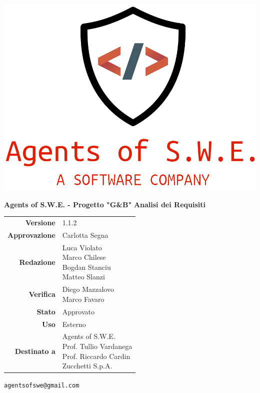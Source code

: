 


\begin{titlepage}
\thispagestyle{empty}

\begin{center}

\includegraphics[scale=0.3]{./images/logo.png} 

\large \textbf{Agents of S.W.E. - Progetto "G\&B"}
\vfill
\Huge \textbf{Analisi dei Requisiti}
\vfill
\large
\renewcommand{\arraystretch}{1.3}
\begin{tabular}{r|l}
\textbf{Versione} & 1.1.2\\
\textbf{Approvazione} & Carlotta Segna\\
\textbf{Redazione} & \parbox[t]{5cm}{Luca Violato\\Marco Chilese\\Bogdan Stanciu\\Matteo Slanzi}\\
\textbf{Verifica} & \parbox[t]{5cm}{Diego Mazzalovo\\Marco Favaro}\\
\textbf{Stato} & Approvato\\
\textbf{Uso} & Esterno\\
\textbf{Destinato a} & \parbox[t]{5cm}{Agents of S.W.E. \\Prof. Tullio Vardanega\\Prof. Riccardo Cardin \\ Zucchetti S.p.A.}
\end{tabular}
\vfill
\small
\texttt{agentsofswe@gmail.com}
\end{center}
\end{titlepage}

